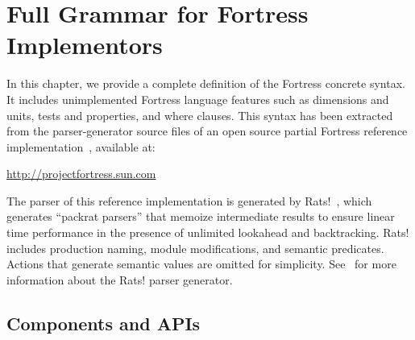 %
%
%
%

\chapter{Full Grammar for Fortress Implementors}


In this chapter, we provide a complete definition of the Fortress concrete
syntax.  It includes unimplemented Fortress language features
such as dimensions and units, tests and properties, and where
clauses.  This syntax has been extracted from the parser-generator source
files of an open source partial Fortress reference
implementation~\cite{FortressInterpreter}, available at:

\begin{center}
\url{http://projectfortress.sun.com}
\end{center}

The parser of this reference implementation is generated by Rats!~\cite{Rats},
which generates ``packrat parsers'' that memoize intermediate results to
ensure linear time performance in the presence of unlimited lookahead and
backtracking.  Rats! includes production naming, module modifications, and
semantic predicates.  Actions that generate
semantic values are omitted for simplicity. See~\cite{Rats} for more
information about the Rats! parser generator.

\footnotesize

\section{Components and APIs}


